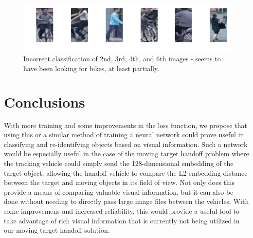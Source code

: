 \begin{figure}[H]
    \centering \includegraphics[width=0.8\columnwidth]{figures/person_reid/example10_bike_detector.png}
    \caption{Incorrect classification of 2nd, 3rd, 4th, and 6th images - seems to have been looking for bikes, at least partially.}
\end{figure}


\section{Conclusions}
With more training and some improvements in the loss function, we propose that using this or a similar method of training a neural network could prove useful in classifying and re-identifying objects based on visual information. Such a network would be especially useful in the case of the moving target handoff problem where the tracking vehicle could simply send the 128-dimensional embedding of the target object, allowing the handoff vehicle to compare the L2 embedding distance between the target and moving objects in its field of view. Not only does this provide a means of comparing valuable visual information, but it can also be done without needing to directly pass large image files between the vehicles. With some improvemens and increased reliability, this would provide a useful tool to take advantage of rich visual information that is currently not being utilized in our moving target handoff solution.
